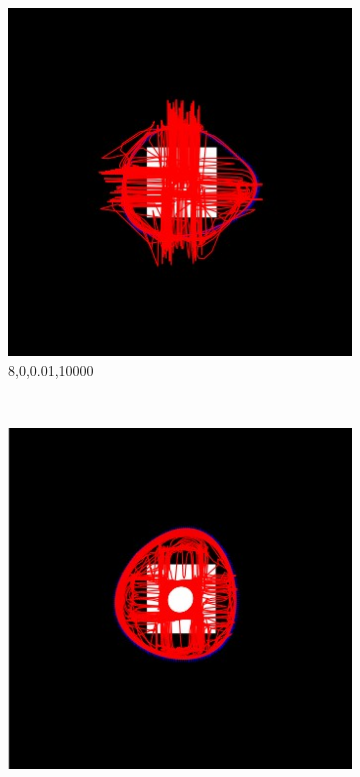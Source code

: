 \documentclass[paper=a4, fontsize=11pt]{scrartcl} %
\numberwithin{equation}{section} %
\numberwithin{figure}{section} %
\numberwithin{table}{section} %
\begin{document}
\begin{figure}[H]
        \centering
        \begin{subfigure}[b]{0.2\textwidth}
                \includegraphics[width=\textwidth]{101}
                \caption{8,0,0.01,10000}
                \label{fig:Blacksquare1}
        \end{subfigure}%
        ~ %
        \begin{subfigure}[b]{0.2\textwidth}
                \includegraphics[width=\textwidth]{103}

\end{subfigure}
\end{figure}
\end{document}
